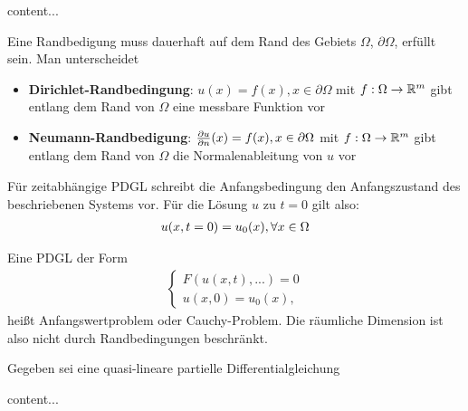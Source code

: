 \begin{definition}
	content...
\end{definition}

\begin{definition}[Randbedingungen	]
	Eine Randbedigung muss dauerhaft auf dem Rand des Gebiets $\Omega$, $\partial \Omega$, erfüllt sein. Man unterscheidet
	\begin{itemize}[noitemsep]
		\item \textbf{Dirichlet-Randbedingung}: $u(x) = f(x), x \in \partial \Omega$ mit $f : \Omega \rightarrow \mathbb{R}^m$ gibt entlang dem Rand von $\Omega$ eine messbare Funktion vor
		\item  \textbf{Neumann-Randbedigung}: $\frac{\partial u}{\partial n}(x) = f(x), x \in \partial \Omega$ mit $f : \Omega \rightarrow \mathbb{R}^m$ gibt entlang dem Rand von $\Omega$ die Normalenableitung von $u$ vor
	\end{itemize}
\end{definition}

\begin{definition}[Anfangsbedingungen]
	Für zeitabhängige PDGL schreibt die Anfangsbedingung den Anfangszustand des beschriebenen Systems vor. Für die Lösung $u$ zu $t=0$ gilt also:
	\begin{align*}
		u(x,t = 0) = u_0(x), \forall x \in \Omega
	\end{align*}
\end{definition}

\begin{definition}
	Eine PDGL der Form
	\begin{align*}
		\begin{cases}
			F(u(x,t),...) = 0 \\
			u(x, 0) = u_0(x)
,		\end{cases}
	\end{align*}
	heißt Anfangswertproblem oder Cauchy-Problem. Die räumliche Dimension ist also nicht durch Randbedingungen beschränkt.
\end{definition}

\begin{satz}
	Gegeben sei eine quasi-lineare partielle Differentialgleichung
\end{satz}


\begin{satz}
	content...
\end{satz}


